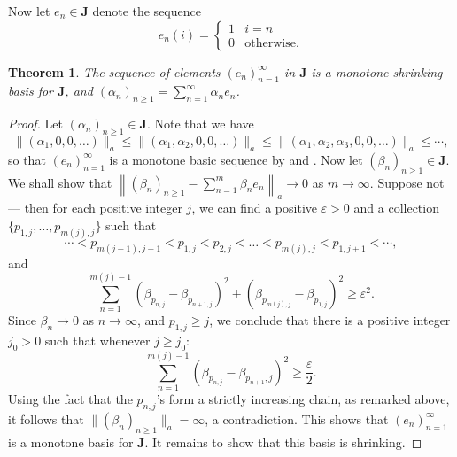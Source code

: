 \documentclass[11pt]{article}
\theoremstyle{thmstyle}
\newtheorem{theorem}{Theorem}[section]
\theoremstyle{defstyle}
\renewcommand{\le}{\leqslant}
\renewcommand{\ge}{\geqslant}
\newcommand{\bfJ}{\mathbf{J}}
\begin{document}
Now let $e_n\in\bfJ$ denote the sequence 
\begin{equation*}
	e_n(i) = \begin{cases}
		1 & i = n\\
		0 & \text{otherwise}.
	\end{cases}
\end{equation*}

\begin{theorem}
	The sequence of elements $(e_n)_{n = 1}^\infty$ in $\bfJ$ is a monotone shrinking basis for $\bfJ$, and $(\alpha_n)_{n\ge 1} = \displaystyle\sum_{n = 1}^\infty \alpha_n e_n$. 
\end{theorem}
\begin{proof}
	Let $(\alpha_n)_{n\ge 1}\in\bfJ$. Note that we have 
	\begin{equation*}
		\|(\alpha_1, 0, 0, \dots)\|_a\le \|(\alpha_1, \alpha_2, 0, 0, \dots)\|_a\le \|(\alpha_1, \alpha_2, \alpha_3, 0, 0, \dots)\|_a\le\cdots,
	\end{equation*}
	so that $(e_n)_{n = 1}^\infty$ is a monotone basic sequence by  and . Now let $(\beta_n)_{n\ge 1}\in\bfJ$. We shall show that $\displaystyle\left\|(\beta_n)_{n\ge 1} - \sum_{n = 1}^m \beta_n e_n\right\|_a\to 0$ as $m\to\infty$. Suppose not --- then for each positive integer $j$, we can find a positive $\varepsilon > 0$ and a collection $\{p_{1, j}, \dots, p_{m(j), j}\}$ such that 
	\begin{equation*}
		\cdots < p_{m(j - 1), j - 1} < p_{1, j} < p_{2, j} < \dots < p_{m(j), j} < p_{1, j + 1} < \cdots,
	\end{equation*}
	and 
	\begin{equation*}
		\sum_{n = 1}^{m(j) - 1} \left(\beta_{p_{n, j}} - \beta_{p_{n + 1, j}}\right)^2 + \left(\beta_{p_{m(j), j}} - \beta_{p_{1, j}}\right)^2\ge \varepsilon^2.
	\end{equation*}
	Since $\beta_n\to 0$ as $n\to\infty$, and $p_{1, j}\ge j$, we conclude that there is a positive integer $j_0 > 0$ such that whenever $j\ge j_0$: 
	\begin{equation*}
		\sum_{n = 1}^{m(j) - 1}\left(\beta_{p_{n, j}} - \beta_{p_{n + 1}, j}\right)^2\ge\frac{\varepsilon}{2}.
	\end{equation*}
	Using the fact that the $p_{n, j}$'s form a strictly increasing chain, as remarked above, it follows that $\|(\beta_n)_{n\ge 1}\|_a = \infty$, a contradiction. This shows that $(e_n)_{n = 1}^\infty$ is a monotone basis for $\bfJ$. It remains to show that this basis is shrinking.


\end{proof}
\end{document}
